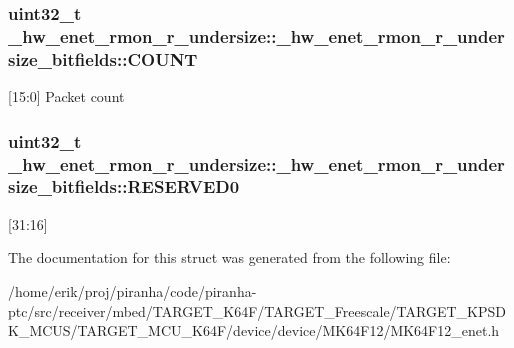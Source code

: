\subsubsection[{\texorpdfstring{C\+O\+U\+NT}{COUNT}}]{\setlength{\rightskip}{0pt plus 5cm}uint32\+\_\+t \+\_\+hw\+\_\+enet\+\_\+rmon\+\_\+r\+\_\+undersize\+::\+\_\+hw\+\_\+enet\+\_\+rmon\+\_\+r\+\_\+undersize\+\_\+bitfields\+::\+C\+O\+U\+NT}\hypertarget{struct__hw__enet__rmon__r__undersize_1_1__hw__enet__rmon__r__undersize__bitfields_a751459854072c81ec701e51f67146bb9}{}\label{struct__hw__enet__rmon__r__undersize_1_1__hw__enet__rmon__r__undersize__bitfields_a751459854072c81ec701e51f67146bb9}
\mbox{[}15\+:0\mbox{]} Packet count 
\subsubsection[{\texorpdfstring{R\+E\+S\+E\+R\+V\+E\+D0}{RESERVED0}}]{\setlength{\rightskip}{0pt plus 5cm}uint32\+\_\+t \+\_\+hw\+\_\+enet\+\_\+rmon\+\_\+r\+\_\+undersize\+::\+\_\+hw\+\_\+enet\+\_\+rmon\+\_\+r\+\_\+undersize\+\_\+bitfields\+::\+R\+E\+S\+E\+R\+V\+E\+D0}\hypertarget{struct__hw__enet__rmon__r__undersize_1_1__hw__enet__rmon__r__undersize__bitfields_ae2fe3a54ae1c453b536f3782a6a898db}{}\label{struct__hw__enet__rmon__r__undersize_1_1__hw__enet__rmon__r__undersize__bitfields_ae2fe3a54ae1c453b536f3782a6a898db}
\mbox{[}31\+:16\mbox{]} 

The documentation for this struct was generated from the following file\+:\begin{DoxyCompactItemize}
\item 
/home/erik/proj/piranha/code/piranha-\/ptc/src/receiver/mbed/\+T\+A\+R\+G\+E\+T\+\_\+\+K64\+F/\+T\+A\+R\+G\+E\+T\+\_\+\+Freescale/\+T\+A\+R\+G\+E\+T\+\_\+\+K\+P\+S\+D\+K\+\_\+\+M\+C\+U\+S/\+T\+A\+R\+G\+E\+T\+\_\+\+M\+C\+U\+\_\+\+K64\+F/device/device/\+M\+K64\+F12/M\+K64\+F12\+\_\+enet.\+h\end{DoxyCompactItemize}
